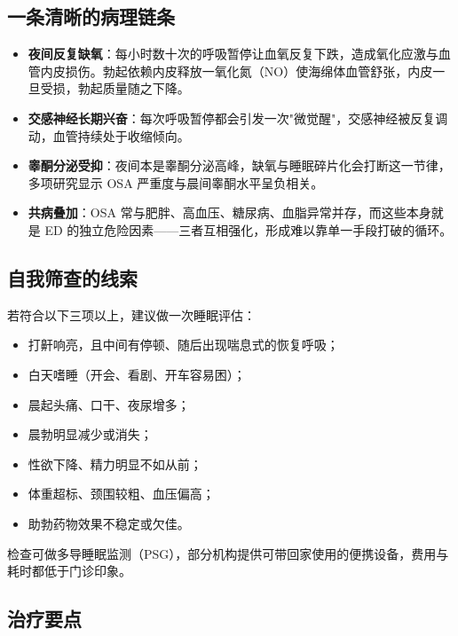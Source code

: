 \subsection{一条清晰的病理链条}

\begin{itemize}
	\item \textbf{夜间反复缺氧}：每小时数十次的呼吸暂停让血氧反复下跌，造成氧化应激与血管内皮损伤。勃起依赖内皮释放一氧化氮（NO）使海绵体血管舒张，内皮一旦受损，勃起质量随之下降。
	\item \textbf{交感神经长期兴奋}：每次呼吸暂停都会引发一次"微觉醒"，交感神经被反复调动，血管持续处于收缩倾向。
	\item \textbf{睾酮分泌受抑}：夜间本是睾酮分泌高峰，缺氧与睡眠碎片化会打断这一节律，多项研究显示 OSA 严重度与晨间睾酮水平呈负相关。
	\item \textbf{共病叠加}：OSA 常与肥胖、高血压、糖尿病、血脂异常并存，而这些本身就是 ED 的独立危险因素——三者互相强化，形成难以靠单一手段打破的循环。
\end{itemize}

\subsection{自我筛查的线索}

若符合以下三项以上，建议做一次睡眠评估：

\begin{itemize}
	\item 打鼾响亮，且中间有停顿、随后出现喘息式的恢复呼吸；
	\item 白天嗜睡（开会、看剧、开车容易困）；
	\item 晨起头痛、口干、夜尿增多；
	\item 晨勃明显减少或消失；
	\item 性欲下降、精力明显不如从前；
	\item 体重超标、颈围较粗、血压偏高；
	\item 助勃药物效果不稳定或欠佳。
\end{itemize}

\noindent 检查可做多导睡眠监测（PSG），部分机构提供可带回家使用的便携设备，费用与耗时都低于门诊印象。

\subsection{治疗要点}

